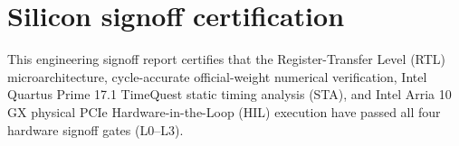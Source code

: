 \documentclass[11pt,a4paper]{article}
\begin{document}
\section{Silicon signoff certification}

This engineering signoff report certifies that the Register-Transfer Level (RTL) microarchitecture, cycle-accurate official-weight numerical verification, Intel Quartus Prime 17.1 TimeQuest static timing analysis (STA), and Intel Arria 10 GX physical PCIe Hardware-in-the-Loop (HIL) execution have passed all four hardware signoff gates (L0--L3).
\end{document}
